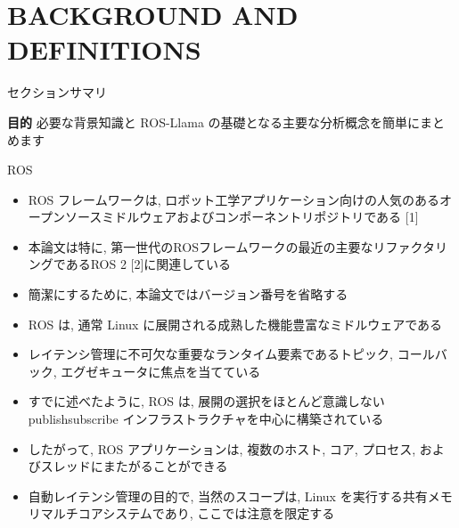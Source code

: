 
\section{BACKGROUND AND DEFINITIONS}
\label{sec: background and definitions}

\begin{frame}{セクションサマリ}
    \begin{itembox}[l]{\textbf{目的}}
        必要な背景知識と ROS-Llama の基礎となる主要な分析概念を簡単にまとめます
    \end{itembox}
\end{frame}

\begin{frame}{ROS}
    \begin{itemize}
        \item ROS フレームワークは, ロボット工学アプリケーション向けの人気のあるオープンソースミドルウェアおよびコンポーネントリポジトリである [1]
\item 本論文は特に, 第一世代のROSフレームワークの最近の主要なリファクタリングであるROS 2 [2]に関連している
\item 簡潔にするために, 本論文ではバージョン番号を省略する
    \end{itemize}
\end{frame}

\begin{frame}{}
    \begin{itemize}
        \item ROS は, 通常 Linux に展開される成熟した機能豊富なミドルウェアである
\item レイテンシ管理に不可欠な重要なランタイム要素であるトピック, コールバック, エグゼキュータに焦点を当てている
    \end{itemize}
\end{frame}

\begin{frame}{}
    \begin{itemize}
        \item すでに述べたように, ROS は, 展開の選択をほとんど意識しない publishsubscribe インフラストラクチャを中心に構築されている
\item したがって, ROS アプリケーションは, 複数のホスト, コア, プロセス, およびスレッドにまたがることができる
\item 自動レイテンシ管理の目的で, 当然のスコープは, Linux を実行する共有メモリマルチコアシステムであり, ここでは注意を限定する
    \end{itemize}
\end{frame}

